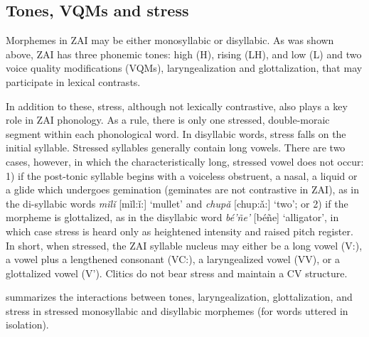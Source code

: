 \subsection{Tones, VQMs and stress}\label{tones}

Morphemes in ZAI may be either monosyllabic or disyllabic. As was shown above, ZAI has three phonemic tones: high (H), rising (LH), and low (L) and two voice quality modifications (VQMs), laryngealization and glottalization, that may participate in lexical contrasts. 

In addition to these, stress, although not lexically contrastive, also plays a key role in ZAI phonology. As a rule, there is only one stressed, double-moraic segment within each phonological word. In disyllabic words, stress falls on the initial syllable. Stressed syllables generally contain long vowels. There are two cases, however, in which the characteristically long, stressed vowel does not occur: 1) if the post-tonic syllable begins with a voiceless obstruent, a nasal, a liquid or a glide which undergoes gemination (geminates are not contrastive in ZAI), as in the di-syllabic words \textit{m\v{i}l\v{i}} [m\v{i}l:\v{i}:] `mullet' and \textit{chup\v{a}} [chup:\v{a}:] `two'; or 2) if the morpheme is glottalized, as in the disyllabic word \textit{b\'{e}'\~{n}e'} [b\'{e}\~{n}e] `alligator', in which case stress is heard only as heightened intensity and raised pitch register. In short, when stressed, the ZAI syllable nucleus may either be a long vowel (V:), a vowel plus a lengthened consonant (VC:), a laryngealized vowel (VV), or a glottalized vowel (V'). Clitics do not bear stress and maintain a CV structure.

 summarizes the interactions between tones, laryngealization, glottalization, and stress in stressed monosyllabic and disyllabic morphemes (for words uttered in isolation).

